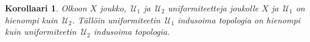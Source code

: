\documentclass[12pt,a4paper,leqno]{report}
\newcommand{\U}{\,\mathcal{U}}
\theoremstyle{plain}
\newtheorem{kor}[equation]{Korollaari}
\theoremstyle{definition}
\newtheorem{maar}[equation]{Määritelmä}
\theoremstyle{remark}
\begin{document}
\begin{kor}
Olkoon $X$ joukko, $\U_1$ ja $\U_2$ uniformiteetteja joukolle $X$ ja 
$\U_1$ on hienompi kuin $\U_2$. 
Tällöin uniformiteetin $\U_1$ indusoima topologia on hienompi kuin 
uniformiteetin $\U_2$ indusoima topologia.
\end{kor}
\end{document}
